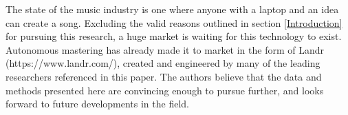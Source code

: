 \documentclass{article}
\begin{document}
The state of the music industry is one where anyone with a laptop and an idea can create a song.  Excluding the valid reasons outlined in section \ref{Introduction} for pursuing this research, a huge market is waiting for this technology to exist.  Autonomous mastering has already made it to market in the form of Landr (https://www.landr.com/), created and engineered by many of the leading researchers referenced in this paper.  The authors believe that the data and methods presented here are convincing enough to pursue further, and looks forward to future developments in the field.


\end{document}

